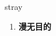 
\begin{frame}
{\huge stray}
\begin{center}
\begin{enumerate}\Large
  \item \textbf{漫无目的}
\end{enumerate}
\end{center}
\end{frame}
